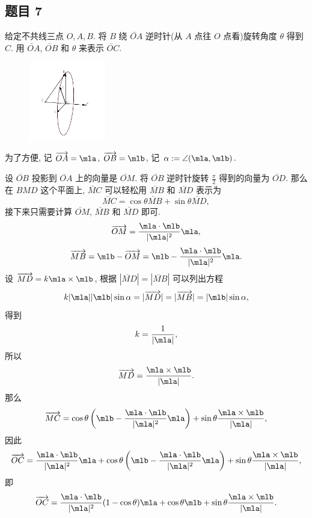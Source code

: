 \subsection*{ 题目 7 }
\begin{problem*}
给定不共线三点 $O, A, B$. 将 $B$ 绕 $\lvec{OA}$ 逆时针(从 $A$ 点往 $O$ 点看)旋转角度 $\theta$ 得到 $C$. 用 $\lvec{OA}$, $\lvec{OB}$ 和 $\theta$ 来表示 $\lvec{OC}$.
\end{problem*}
\begin{solution}
    \begin{figure}[htbp]
        \centering
        \includegraphics[width=0.3\textwidth]{./img/pic1.png} %
    \end{figure}

为了方便, 记 $\lvec{OA} = \mla$, $\lvec{OB} = \mlb$, 记 $\alpha := \angle(\mla, \mlb)$.

设 $\lvec{OB}$ 投影到 $\lvec{OA}$ 上的向量是 $\lvec{OM}$. 将 $\lvec{OB}$ 逆时针旋转 $\frac{\pi}{2}$ 得到的向量为 $\lvec{OD}$. 那么在 $BMD$ 这个平面上, $\lvec{MC}$ 可以轻松用 $\lvec{MB}$ 和 $\lvec{MD}$ 表示为
\[
    \lvec{MC} = \cos \theta \lvec{MB} + \sin \theta \lvec{MD},
\]
接下来只需要计算 $\lvec{OM}$, $\lvec{MB}$ 和 $\lvec{MD}$ 即可.
\[
    \lvec{OM} = \frac{\mla \cdot \mlb}{|\mla|^2}\mla,
\]  
\[
    \lvec{MB} = \mlb - \lvec{OM} = \mlb - \frac{\mla \cdot \mlb}{|\mla|^2}\mla.
\]
设 $\lvec{MD} = k \mla \times \mlb$, 根据 $|\lvec{MD}| = |\lvec{MB}|$ 可以列出方程
\[
    k |\mla| |\mlb| \sin \alpha = |\lvec{MD}| = |\lvec{MB}| = |\mlb| \sin \alpha,
\] 
得到
\[
    k = \frac{1}{|\mla|},
\]
所以
\[
    \lvec{MD} = \frac{\mla \times \mlb}{|\mla|}.
\]
那么
\[
    \lvec{MC} = \cos \theta \left(\mlb - \frac{\mla \cdot \mlb}{|\mla|^2}\mla\right) + \sin \theta \frac{\mla \times \mlb}{|\mla|},
\]
因此
\[
    \lvec{OC} = \frac{\mla \cdot \mlb}{|\mla|^2}\mla + \cos \theta \left(\mlb - \frac{\mla \cdot \mlb}{|\mla|^2}\mla\right) + \sin \theta \frac{\mla \times \mlb}{|\mla|},
\]
即
\[
    \lvec{OC} = \frac{\mla \cdot \mlb}{|\mla|^2}(1 - \cos \theta)\mla + \cos \theta \mlb + \sin \theta \frac{\mla \times \mlb}{|\mla|}.
\]
\end{solution}

